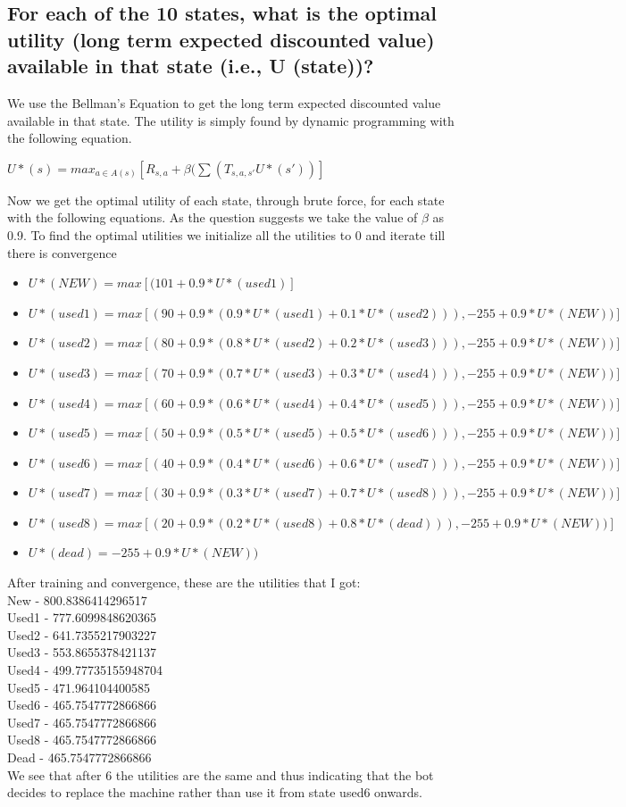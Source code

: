 \documentclass[11pt]{scrartcl} %
\begin{document}
\subsection{For each of the 10 states, what is the optimal utility (long term expected discounted value) available in that
state (i.e., U \* (state))?}
We use the Bellman's Equation to get the long term expected discounted value available in that state. The utility is simply found by dynamic programming with the following equation.
\begin{center}
$U*(s) = max_{a\in A(s)}[R_{s, a}+\beta (\sum(T_{s, a, s'}U*(s'))]$
\end{center}
Now we get the optimal utility of each state, through brute force, for each state with the following equations. As the question suggests we take the value of $\beta$ as 0.9. To find the optimal utilities we initialize all the utilities to 0 and iterate till there is convergence
\begin{itemize}
\item $U*(NEW) = max[(101+0.9*U*(used1)]$ 
\item $U*(used1) = max[(90+0.9*(0.9*U*(used1)+0.1*U*(used2))), -255+0.9*U*(NEW))]$ 
\item $U*(used2) = max[(80+0.9*(0.8*U*(used2)+0.2*U*(used3))), -255+0.9*U*(NEW))]$ 
\item $U*(used3) = max[(70+0.9*(0.7*U*(used3)+0.3*U*(used4))), -255+0.9*U*(NEW))]$ 
\item $U*(used4) = max[(60+0.9*(0.6*U*(used4)+0.4*U*(used5))), -255+0.9*U*(NEW))]$ 
\item $U*(used5) = max[(50+0.9*(0.5*U*(used5)+0.5*U*(used6))), -255+0.9*U*(NEW))]$ 
\item $U*(used6) = max[(40+0.9*(0.4*U*(used6)+0.6*U*(used7))), -255+0.9*U*(NEW))]$ 
\item $U*(used7) = max[(30+0.9*(0.3*U*(used7)+0.7*U*(used8))), -255+0.9*U*(NEW))]$ 
\item $U*(used8) = max[(20+0.9*(0.2*U*(used8)+0.8*U*(dead))), -255+0.9*U*(NEW))]$ 
\item $U*(dead) = -255 + 0.9*U*(NEW))$ 

\end{itemize}
After training and convergence, these are the utilities that I got:\\
New - 800.8386414296517\\
Used1 - 777.6099848620365\\
Used2 - 641.7355217903227\\
Used3 - 553.8655378421137\\
Used4 - 499.77735155948704\\
Used5 - 471.964104400585\\
Used6 - 465.7547772866866\\
Used7 - 465.7547772866866\\
Used8 - 465.7547772866866\\
Dead - 465.7547772866866\\
We see that after 6 the utilities are the same and thus indicating that the bot decides to replace the machine rather than use it from state used6 onwards. 
\end{document}
